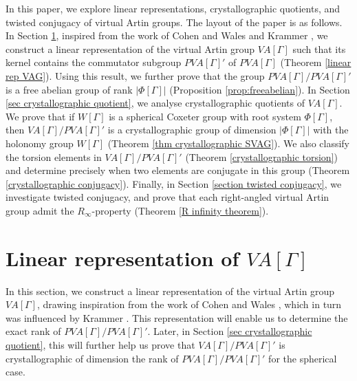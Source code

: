 \documentclass[12pt]{amsart}
\numberwithin{equation}{section}
\begin{document}
In this paper, we explore linear representations, crystallographic quotients, and twisted conjugacy of virtual Artin groups. The layout of the paper is as follows. In Section \ref{section linear representation}, inspired from the work of Cohen and Wales \cite{MR1942303} and Krammer \cite{MR1888796}, we construct a linear representation of the virtual Artin group $VA[\Gamma]$ such that its kernel contains the commutator subgroup $PVA[\Gamma]'$ of $PVA[\Gamma]$ (Theorem \ref{linear rep VAG}). Using this result, we further prove that  the group $PVA[\Gamma]/PVA[\Gamma]'$ is a free abelian group of rank $|\Phi[\Gamma]|$ (Proposition \ref{prop:freeabelian}). In Section \ref{sec crystallographic quotient}, we analyse crystallographic quotients of $VA[\Gamma]$. We prove that if $W[\Gamma]$ is a spherical Coxeter group with root system $\Phi[\Gamma]$, then $VA[\Gamma]/PVA[\Gamma]'$ is a crystallographic group of dimension $ |\Phi[\Gamma]|$ with the holonomy group $W[\Gamma]$ (Theorem \ref{thm crystallographic SVAG}). We also classify the torsion elements in $VA[\Gamma]/PVA[\Gamma]'$ (Theorem \ref{crystallographic torsion}) and determine precisely when two elements are conjugate in this group (Theorem \ref{crystallographic conjugacy}). Finally, in Section \ref{section twisted conjugacy}, we investigate twisted conjugacy, and prove that each right-angled virtual Artin group admit the $R_\infty$-property (Theorem \ref{R infinity theorem}). 
\medskip



\section{Linear representation of $VA[\Gamma]$}\label{section linear representation}
In this section, we construct a linear representation of the virtual Artin group $VA[\Gamma]$, drawing inspiration from the work of Cohen and Wales \cite{MR1942303}, which in turn was influenced by Krammer \cite{MR1888796}. This representation will enable us to determine the exact rank of  $PVA[\Gamma]/PVA[\Gamma]'$. Later, in Section \ref{sec crystallographic quotient}, this will further help us prove that $VA[\Gamma]/PVA[\Gamma]'$ is crystallographic of dimension the rank of  $PVA[\Gamma]/PVA[\Gamma]'$ for the spherical case.
\end{document}
